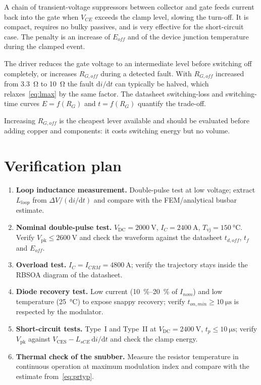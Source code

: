 \documentclass[11pt,a4paper]{article}
\newcommand{\Vces}{V_{\mathrm{CES}}}
\newcommand{\Vdc}{V_{\mathrm{DC}}}
\newcommand{\Vpk}{V_{\mathrm{pk}}}
\newcommand{\Tvj}{T_{\mathrm{vj}}}
\begin{document}
\begin{description}[nosep,style=nextline]
\item[Active clamping] A chain of transient-voltage suppressors between
      collector and gate feeds current back into the gate when $V_{CE}$
      exceeds the clamp level, slowing the turn-off. It is compact, requires
      no bulky passives, and is very effective for the short-circuit case. The
      penalty is an increase of $E_{off}$ and of the device junction
      temperature during the clamped event.
\item[Two-level (soft) turn-off] The driver reduces the gate voltage to an
      intermediate level before switching off completely, or increases
      $R_{G,off}$ during a detected fault. With $R_{G,off}$ increased from
      \SI{3.3}{\ohm} to \SI{10}{\ohm} the fault $\mathrm{d}i/\mathrm{d}t$ can
      typically be halved, which relaxes~\eqref{eq:lmax} by the same factor.
      The datasheet switching-loss and switching-time curves
      $E = f(R_G)$ and $t = f(R_G)$ quantify the trade-off.
\end{description}

Increasing $R_{G,off}$ is the cheapest lever available and should be evaluated
before adding copper and components: it costs switching energy but no volume.

\section{Verification plan}

\begin{enumerate}[nosep]
\item \textbf{Loop inductance measurement.} Double-pulse test at low voltage;
      extract $L_{loop}$ from $\Delta V/(\mathrm{d}i/\mathrm{d}t)$ and compare
      with the FEM/analytical busbar estimate.
\item \textbf{Nominal double-pulse test.} $\Vdc = \SI{2000}{\volt}$,
      $I_C = \SI{2400}{\ampere}$, $\Tvj = \SI{150}{\celsius}$. Verify
      $\Vpk \le \SI{2600}{\volt}$ and check the waveform against the
      datasheet $t_{d,off}$, $t_f$ and $E_{off}$.
\item \textbf{Overload test.} $I_C = I_{CRM} = \SI{4800}{\ampere}$; verify the
      trajectory stays inside the RBSOA diagram of the datasheet.
\item \textbf{Diode recovery test.} Low current (\SIrange{10}{20}{\percent} of
      $I_{nom}$) and low temperature (\SI{25}{\celsius}) to expose snappy
      recovery; verify $t_{on,min} \ge \SI{10}{\micro\second}$ is respected by
      the modulator.
\item \textbf{Short-circuit tests.} Type~I and Type~II at
      $\Vdc = \SI{2400}{\volt}$, $t_p \le \SI{10}{\micro\second}$; verify
      $\Vpk$ against $\Vces - L_{sCE}\,\mathrm{d}i/\mathrm{d}t$ and check the
      clamp energy.
\item \textbf{Thermal check of the snubber.} Measure the resistor temperature
      in continuous operation at maximum modulation index and compare with the
      estimate from~\eqref{eq:prtyp}.
\end{enumerate}
\end{document}
